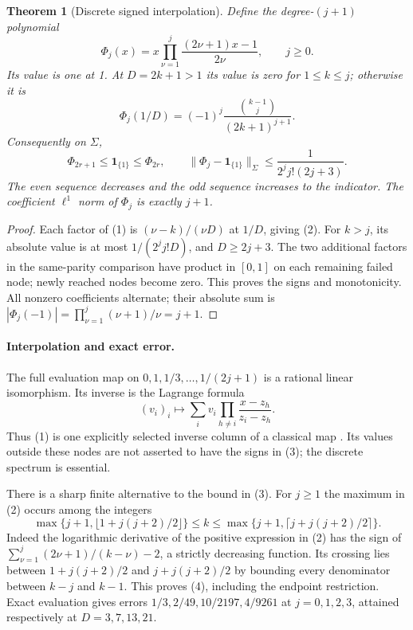 \documentclass[10pt,a4paper]{article}
\newtheorem{theorem}{Theorem}
\begin{document}
\begin{theorem}[Discrete signed interpolation]
Define the degree-$(j+1)$ polynomial
\[
 \Phi_j(x)=x\prod_{\nu=1}^j\frac{(2\nu+1)x-1}{2\nu},\qquad j\ge0.
 \tag{1}
\]
Its value is one at 1. At $D=2k+1>1$ its value is zero for $1\le k\le j$;
otherwise it is
\[
 \Phi_j(1/D)=(-1)^j\frac{\binom{k-1}{j}}{(2k+1)^{j+1}}.
 \tag{2}
\]
Consequently on $\Sigma$,
\[
 \Phi_{2r+1}\le\mathbf1_{\{1\}}\le\Phi_{2r},\qquad
 \|\Phi_j-\mathbf1_{\{1\}}\|_\Sigma
 \le\frac1{2^j j!(2j+3)}.
 \tag{3}
\]
The even sequence decreases and the odd sequence increases to the indicator.
The coefficient $\ell^1$ norm of $\Phi_j$ is exactly $j+1$.
\end{theorem}
\begin{proof}
Each factor of (1) is $(\nu-k)/(\nu D)$ at $1/D$, giving (2).
For $k>j$, its absolute value is at most $1/(2^j j!D)$, and $D\ge2j+3$.
The two additional factors in the same-parity comparison have product in
$[0,1]$ on each remaining failed node; newly reached nodes become zero.
This proves the signs and monotonicity. All nonzero coefficients alternate;
their absolute sum is $|\Phi_j(-1)|=\prod_{\nu=1}^j(\nu+1)/\nu=j+1$.
\end{proof}

\newpage
\paragraph{Interpolation and exact error.}
The full evaluation map on $0,1,1/3,\ldots,1/(2j+1)$ is a rational linear
isomorphism. Its inverse is the Lagrange formula
\[
 (v_i)_i\longmapsto\sum_i v_i\prod_{h\ne i}\frac{x-z_h}{z_i-z_h}.
\]
Thus (1) is one explicitly selected inverse column of a classical map
\cite[\S3.3(i), equations 3.3.1--3.3.3]{DLMF}. Its values outside these nodes
are not asserted to have the signs in (3); the discrete spectrum is essential.

There is a sharp finite alternative to the bound in (3). For $j\ge1$ the
maximum in (2) occurs among the integers
\[
 \max\{j+1,\lfloor1+j(j+2)/2\rfloor\}\le k\le
 \max\{j+1,\lceil j+j(j+2)/2\rceil\}.
 \tag{4}
\]
Indeed the logarithmic derivative of the positive expression in (2) has the
sign of $\sum_{\nu=1}^j(2\nu+1)/(k-\nu)-2$, a strictly decreasing function.
Its crossing lies between $1+j(j+2)/2$ and $j+j(j+2)/2$ by bounding every
denominator between $k-j$ and $k-1$. This proves (4), including the endpoint
restriction. Exact evaluation gives errors $1/3,2/49,10/2197,4/9261$ at
$j=0,1,2,3$, attained respectively at $D=3,7,13,21$.
\end{document}
